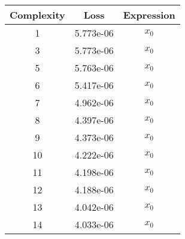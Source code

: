 \begin{center}
        \begin{tabular}{|c|c|c|}
        \hline
        Complexity & Loss & Expression \\
        \hline
        1 & 5.773e-06 & $\begin{aligned}x_{0}\end{aligned}$\\ \hline3 & 5.773e-06 & $\begin{aligned}x_{0}\end{aligned}$\\ \hline5 & 5.763e-06 & $\begin{aligned}x_{0}\end{aligned}$\\ \hline6 & 5.417e-06 & $\begin{aligned}x_{0}\end{aligned}$\\ \hline7 & 4.962e-06 & $\begin{aligned}x_{0}\end{aligned}$\\ \hline8 & 4.397e-06 & $\begin{aligned}x_{0}\end{aligned}$\\ \hline9 & 4.373e-06 & $\begin{aligned}x_{0}\end{aligned}$\\ \hline10 & 4.222e-06 & $\begin{aligned}x_{0}\end{aligned}$\\ \hline11 & 4.198e-06 & $\begin{aligned}x_{0}\end{aligned}$\\ \hline12 & 4.188e-06 & $\begin{aligned}x_{0}\end{aligned}$\\ \hline13 & 4.042e-06 & $\begin{aligned}x_{0}\end{aligned}$\\ \hline14 & 4.033e-06 & $\begin{aligned}x_{0}\end{aligned}$\\ \hline\end{tabular}
        \end{center}
        